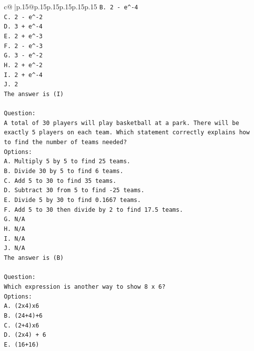 \documentclass{article}
\begin{document}
{\begin{supertabular}{c@{$\;$}|p{.15\linewidth}@{}p{.15\linewidth}p{.15\linewidth}p{.15\linewidth}p{.15\linewidth}p{.15\linewidth}}
{{{\texttt{B. 2 {-} e\^{}{-}4} \\
\texttt{C. 2 {-} e\^{}{-}2} \\
\texttt{D. 3 + e\^{}{-}4} \\
\texttt{E. 2 + e\^{}{-}3} \\
\texttt{F. 2 {-} e\^{}{-}3} \\
\texttt{G. 3 {-} e\^{}{-}2} \\
\texttt{H. 2 + e\^{}{-}2} \\
\texttt{I. 2 + e\^{}{-}4} \\
\texttt{J. 2} \\
\texttt{The answer is (I)} \\
\\ 
\texttt{Question:} \\
\texttt{A total of 30 players will play basketball at a park. There will be exactly 5 players on each team. Which statement correctly explains how to find the number of teams needed?} \\
\texttt{Options:} \\
\texttt{A. Multiply 5 by 5 to find 25 teams.} \\
\texttt{B. Divide 30 by 5 to find 6 teams.} \\
\texttt{C. Add 5 to 30 to find 35 teams.} \\
\texttt{D. Subtract 30 from 5 to find {-}25 teams.} \\
\texttt{E. Divide 5 by 30 to find 0.1667 teams.} \\
\texttt{F. Add 5 to 30 then divide by 2 to find 17.5 teams.} \\
\texttt{G. N/A} \\
\texttt{H. N/A} \\
\texttt{I. N/A} \\
\texttt{J. N/A} \\
\texttt{The answer is (B)} \\
\\ 
\texttt{Question:} \\
\texttt{Which expression is another way to show 8 x 6?} \\
\texttt{Options:} \\
\texttt{A. (2x4)x6} \\
\texttt{B. (24+4)+6} \\
\texttt{C. (2+4)x6} \\
\texttt{D. (2x4) + 6} \\
\texttt{E. (16+16)} \\
            }
        }
    }
     \\ \\


\end{supertabular}}
\end{document}
